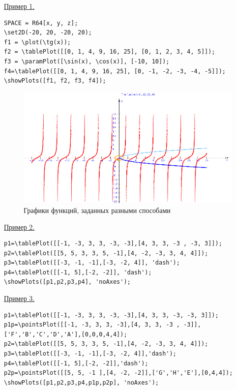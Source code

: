 \underline{Пример 1.}
 
 \vspace*{-2mm}

\begin{verbatim}
SPACE = R64[x, y, z];
\set2D(-20, 20, -20, 20);
f1 = \plot(\tg(x));
f2 = \tablePlot([[0, 1, 4, 9, 16, 25], [0, 1, 2, 3, 4, 5]]);
f3 = \paramPlot([\sin(x), \cos(x)], [-10, 10]);
f4=\tablePlot([[0, 1, 4, 9, 16, 25], [0, -1, -2, -3, -4, -5]]);
\showPlots([f1, f2, f3, f4]);
\end{verbatim}
\begin{figure}[!ht]
 \includegraphics[scale=0.6]{pictures/3_6}
\caption{Графики функций,  заданных разными способами}
\label{3_6}
\end{figure}

\underline{Пример 2.}
 
 \vspace*{-2mm}

 \begin{verbatim}
p1=\tablePlot([[-1, -3, 3, 3, -3, -3],[4, 3, 3, -3 , -3, 3]]);
p2=\tablePlot([[5, 5, 3, 3, 5, -1],[4, -2, -3, 3, 4, 4]]);
p3=\tablePlot([[-3, -1, -1],[-3, -2, 4]], 'dash');
p4=\tablePlot([[-1, 5],[-2, -2]], 'dash');
\showPlots([p1,p2,p3,p4], 'noAxes');
 \end{verbatim}

\underline{Пример 3.}
 
 \vspace*{-2mm}

 \begin{verbatim}
p1=\tablePlot([[-1, -3, 3, 3, -3, -3],[4, 3, 3, -3, -3, 3]]);
p1p=\pointsPlot([[-1, -3, 3, 3, -3],[4, 3, 3, -3 , -3]],
['F','B','C','D','A'],[0,0,0,4,4]);
p2=\tablePlot([[5, 5, 3, 3, 5, -1],[4, -2, -3, 3, 4, 4]]);
p3=\tablePlot([[-3, -1, -1],[-3, -2, 4]],'dash');
p4=\tablePlot([[-1, 5],[-2, -2]],'dash');
p2p=\pointsPlot([[5, 5, -1 ],[4, -2, -2]],['G','H','E'],[0,4,4]);
\showPlots([p1,p2,p3,p4,p1p,p2p], 'noAxes');
 \end{verbatim}


